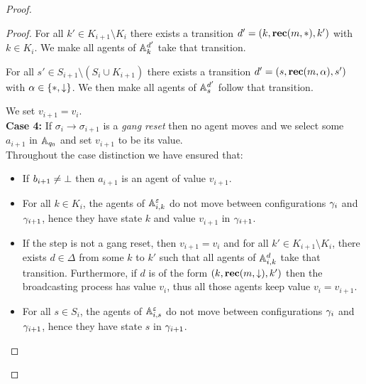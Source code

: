 \begin{proof}
\begin{proof}
	For all $k' \in K_{i+1} \setminus K_i$ there exists a transition $d'=(k, \textbf{rec}(m, *), k')$ with $k \in K_i$. We make all agents of $\mathbb{A}_k^{d'}$ take that transition.
	
	For all $s' \in S_{i+1} \setminus (S_i \cup K_{i+1})$ there exists a transition $d'=(s,\textbf{rec}(m, \alpha),s')$ with $\alpha \in \{*, \downarrow\}$. We then make all agents of $\mathbb{A}_s^{d'}$ follow that transition. 
	
	We set $v_{i+1} = v_i$.
	\\
	
	\textbf{Case 4: }  If $\sigma_i \to \sigma_{i+1}$ is a \emph{gang reset} then no agent moves and we select some $a_{i+1}$ in $\mathbb{A}_{q_0}$ and set $v_{i+1}$ to be its value.
	\\
	
	Throughout the case distinction we have ensured that:
	\begin{itemize}
		\item If $b_{i+1} \neq \bot$ then $a_{i+1}$ is an agent of value $v_{i+1}$.
		
		\item For all $k \in K_{i}$, the agents of $\mathbb{A}_{i,k}^\varepsilon$ do not move between configurations $\gamma_{i}$ and $\gamma_{i+1}$, hence they have state $k$ and value $v_{i+1}$ in $\gamma_{i+1}$.
		
		\item If the step is not a gang reset, then $v_{i+1} = v_i$ and for all $k' \in K_{i+1} \setminus K_i$, there exists $d \in \Delta$ from some $k$ to $k'$ such that all agents of $\mathbb{A}_{i,k}^d$ take that transition. Furthermore, if $d$ is of the form $(k,\textbf{rec}(m, \downarrow),k')$ then the broadcasting process has value $v_i$, thus all those agents keep value $v_i = v_{i+1}$. 
		
		\item For all $s \in S_{i}$, the agents of $\mathbb{A}_{i,s}^\varepsilon$ do not move between configurations $\gamma_{i}$ and $\gamma_{i+1}$, hence they have state $s$ in $\gamma_{i+1}$.
		

\end{itemize}
\end{proof}
\end{proof}
